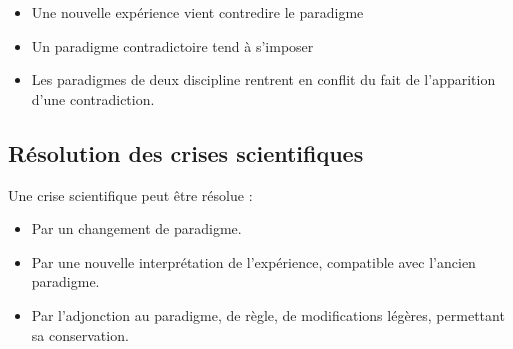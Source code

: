	\begin{itemize}[leftmargin=1cm, label=, itemsep=1pt]
		\item Une nouvelle expérience vient contredire le paradigme
		\item Un paradigme contradictoire tend à s'imposer
		\item Les paradigmes de deux discipline rentrent en conflit du fait de l'apparition d'une contradiction.
	\end{itemize}

  \subsection{Résolution des crises scientifiques}
Une crise scientifique peut être résolue : 

	\begin{itemize}[leftmargin=1cm, label=, itemsep=1pt]
		\item Par un changement de paradigme.
		\item Par une nouvelle interprétation de l'expérience, compatible avec l'ancien paradigme.
		\item Par l'adjonction au paradigme, de règle, de modifications légères, permettant sa conservation.
	\end{itemize}









